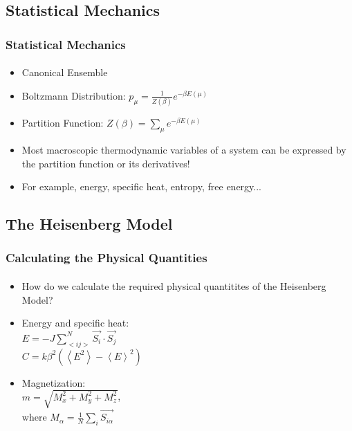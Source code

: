 \documentclass{beamer}
\begin{document}
	\subsection{Statistical Mechanics}
  \begin{frame}
    \frametitle{Statistical Mechanics}
    \framesubtitle{}
    \begin{itemize}
    	\item Canonical Ensemble
    	\item Boltzmann Distribution: $\displaystyle p_\mu = \frac{1}{Z(\beta)}e^{-\beta E(\mu)}$
    	\item Partition Function: $\displaystyle Z(\beta) = \sum_\mu e^{-\beta E(\mu)}$
    	\item Most macroscopic thermodynamic variables of a system can be expressed by the partition function or its derivatives!
    	\item For example, energy, specific heat, entropy, free energy...
    \end{itemize}
  \end{frame}
  \subsection{The Heisenberg Model}
  \begin{frame}
    \frametitle{Calculating the Physical Quantities}
    \framesubtitle{}
    \begin{itemize}
    	\item How do we calculate the required physical quantitites of the Heisenberg Model?
      \item Energy and specific heat:\\
      			$\displaystyle E = -J\sum_{<ij>}^{N}\vec{S_i}\cdot\vec{S_j}$ \\
      			$\displaystyle C = k\beta^2(\left< E^2 \right> - \left< E \right>^2)$ \\
    	\item Magnetization: \\
    				$\displaystyle m = \sqrt{M_x^2 + M_y^2 + M_z^2}$,\\
    				 where $\displaystyle M_\alpha = \frac{1}{N}\sum_i{\vec{S_{i\alpha}}}$
    	
    \end{itemize}
  \end{frame}
\end{document}
